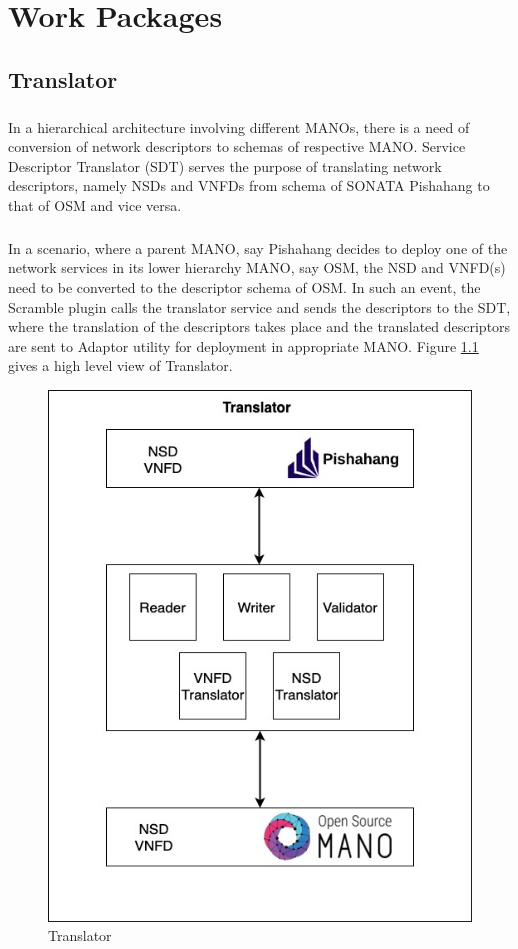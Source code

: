 \chapter{Work Packages}
\label{ch:WP}

\section{Translator}
\paragraph{}
In a hierarchical architecture involving different MANOs, there is a need of conversion of network descriptors to schemas of respective MANO. Service Descriptor Translator (SDT) serves the purpose of translating network descriptors, namely NSDs and VNFDs from schema of SONATA Pishahang to that of OSM and vice versa.
\paragraph{}
In a scenario, where a parent MANO, say Pishahang decides to deploy one of the network services in its lower hierarchy MANO, say OSM, the NSD and VNFD(s) need to be converted to the descriptor schema of OSM. In such an event, the Scramble plugin calls the translator service and sends the descriptors to the SDT, where the translation of the descriptors takes place and the translated descriptors are sent to Adaptor utility for deployment in appropriate MANO. Figure \ref{fig:service-descriptor-translator} gives a high level view of Translator.

\begin{figure}
	\centering
	\includegraphics[width=0.8\linewidth]{"figures/Translator"}
	\caption{Translator}
	\label{fig:service-descriptor-translator}
\end{figure}

